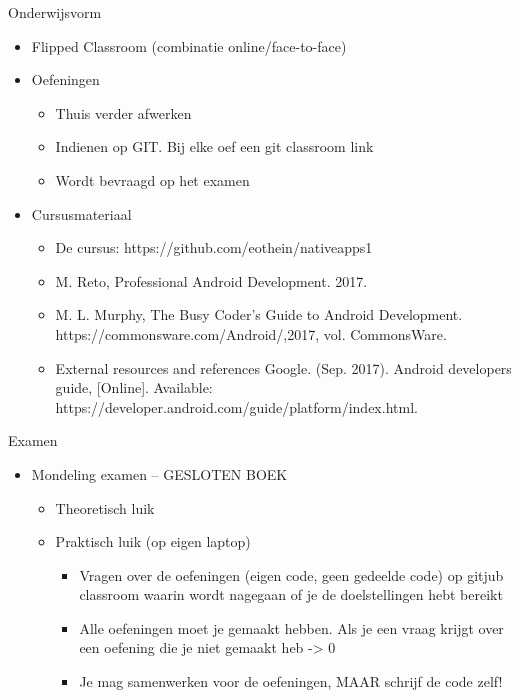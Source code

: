 \documentclass{beamer}
\begin{document}
\begin{frame}{Onderwijsvorm}
\begin{itemize}
	\item Flipped Classroom (combinatie online/face-to-face)
	\item Oefeningen
	\begin{itemize}
	\item Thuis verder afwerken
	\item Indienen op GIT. Bij elke oef een git classroom link
	\item Wordt bevraagd op het examen
\end{itemize}

	\item Cursusmateriaal
	\begin{itemize}
		\item De cursus: https://github.com/eothein/nativeapps1
		\item M. Reto, Professional Android Development. 2017.
		\item 	M. L. Murphy, The Busy Coder’s Guide to Android Development. https://commonsware.com/Android/,2017, vol. CommonsWare.
		
		\item External resources and references Google. (Sep. 2017). Android developers guide, [Online]. Available: https://developer.android.com/guide/platform/index.html.
		
	\end{itemize}
\end{itemize}

\end{frame}

\begin{frame}{Examen}
\begin{itemize}
	\item Mondeling examen – GESLOTEN BOEK
	\begin{itemize}
	\item Theoretisch luik 
	\item Praktisch luik (op eigen laptop)
	\begin{itemize}
	\item Vragen over de oefeningen (eigen code, geen gedeelde code) op gitjub classroom waarin wordt nagegaan of je de doelstellingen hebt bereikt 
	\item Alle oefeningen moet je gemaakt hebben. Als je een vraag krijgt over een oefening die je niet gemaakt heb -> 0
	\item Je mag samenwerken voor de oefeningen, MAAR schrijf de code zelf!\\
		\end{itemize}
		\end{itemize}
		\end{itemize}
\end{frame}
\end{document}
